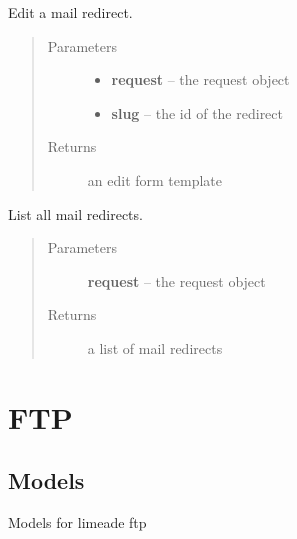 \documentclass[letterpaper,10pt,english]{sphinxmanual}
\begin{document}
\begin{fulllineitems}
\label{api/mail:limeade.mail.views.redirect_edit}
Edit a mail redirect.
\begin{quote}\begin{description}
\item[{Parameters}] \leavevmode\begin{itemize}
\item {} 
\textbf{request} -- the request object

\item {} 
\textbf{slug} -- the id of the redirect

\end{itemize}

\item[{Returns}] \leavevmode
an edit form template

\end{description}\end{quote}

\end{fulllineitems}


\begin{fulllineitems}
\label{api/mail:limeade.mail.views.redirect_list}
List all mail redirects.
\begin{quote}\begin{description}
\item[{Parameters}] \leavevmode
\textbf{request} -- the request object

\item[{Returns}] \leavevmode
a list of mail redirects

\end{description}\end{quote}

\end{fulllineitems}



\section{FTP}
\label{api/ftp:ftp}\label{api/ftp::doc}

\subsection{Models}
\label{api/ftp:models}\label{api/ftp:module-limeade.ftp.models}
Models for limeade ftp
\end{document}
